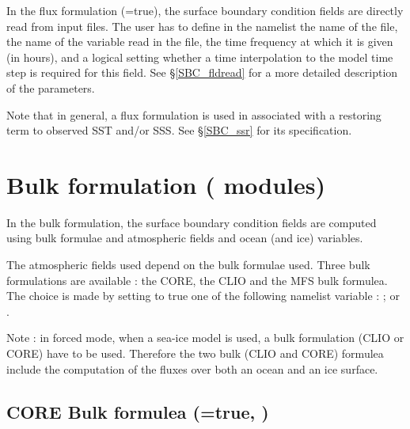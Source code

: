 In the flux formulation (=true), the surface boundary 
condition fields are directly read from input files. The user has to define 
in the namelist  the name of the file, the name of the variable 
read in the file, the time frequency at which it is given (in hours), and a logical 
setting whether a time interpolation to the model time step is required 
for this field. See \S\ref{SBC_fldread} for a more detailed description of the parameters.

Note that in general, a flux formulation is used in associated with a 
restoring term to observed SST and/or SSS. See \S\ref{SBC_ssr} for its 
specification.


\section  [Bulk formulation (\textit{sbcblk\_core}, \textit{sbcblk\_clio} or \textit{sbcblk\_mfs}) ]
		{Bulk formulation \small{(   modules)} }
\label{SBC_blk}

In the bulk formulation, the surface boundary condition fields are computed 
using bulk formulae and atmospheric fields and ocean (and ice) variables. 

The atmospheric fields used depend on the bulk formulae used. Three bulk formulations 
are available : the CORE, the CLIO and the MFS bulk formulea. The choice is made by setting to true
one of the following namelist variable :  ;  or  .

Note : in forced mode, when a sea-ice model is used, a bulk formulation (CLIO or CORE) have to be used. 
Therefore the two bulk (CLIO and CORE) formulea include the computation of the fluxes over both 
an ocean and an ice surface. 

\subsection    [CORE Bulk formulea (\np{ln\_core}=true)]
		      {CORE Bulk formulea (=true, )}
\label{SBC_blk_core}

